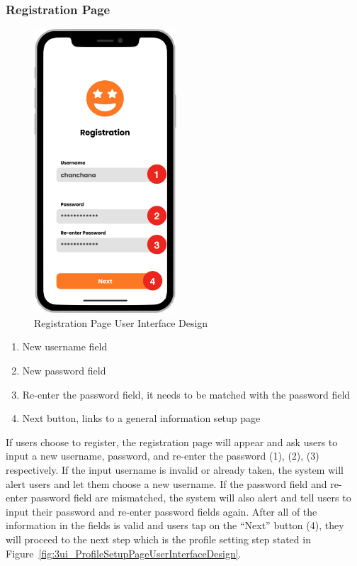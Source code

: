 \documentclass[12pt,oneside,openright,a4paper]{cpe-english-project}
\begin{document}
\newpage
\subsubsection{Registration Page}
\begin{figure}[H]\centering
\includegraphics[height=300pt]{./images/3ui_RegistrationPageUserInterfaceDesign.png}
\caption{Registration Page User Interface Design}\label{fig:3ui_RegistrationPageUserInterfaceDesign}
\end{figure}\vspace{-24pt}

\begin{enumerate}
\item New username field
\item New password field
\item Re-enter the password field, it needs to be matched with the password field
\item Next button, links to a general information setup page
\end{enumerate}

If users choose to register, the registration page will appear and ask users to input a new username, password, and re-enter the password (1), (2), (3) respectively. If the input username is invalid or already taken, the system will alert users and let them choose a new username. If the password field and re-enter password field are mismatched, the system will also alert and tell users to input their password and re-enter password fields again. After all of the information in the fields is valid and users tap on the “Next” button (4), they will proceed to the next step which is the profile setting step stated in Figure~\ref{fig:3ui_ProfileSetupPageUserInterfaceDesign}.
\end{document}
